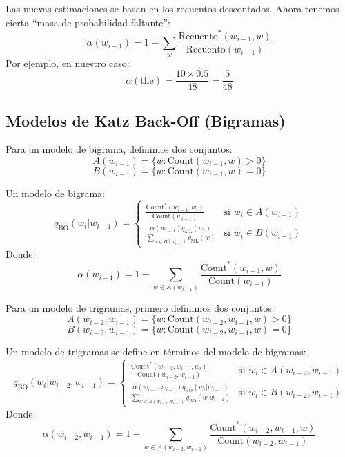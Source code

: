 Las nuevas estimaciones se basan en los recuentos descontados. Ahora tenemos cierta ``masa de probabilidad faltante'':
    \[
    \alpha(w_{i-1}) = 1 - \sum_{w} \frac{{\text{{Recuento}}^*(w_{i-1}, w)}}{{\text{{Recuento}}(w_{i-1})}}
    \]
    Por ejemplo, en nuestro caso:
    \[
    \alpha(\text{{the}}) = \frac{{10 \times 0.5}}{{48}} = \frac{{5}}{{48}}
    \]



\subsection{Modelos de Katz Back-Off (Bigramas)}

Para un modelo de bigrama, definimos dos conjuntos:
    \[
    A(w_{i-1}) = \{w : \text{Count}(w_{i-1}, w) > 0\}
    \]
    \[
    B(w_{i-1}) = \{w : \text{Count}(w_{i-1}, w) = 0\}
    \]

Un modelo de bigrama:
    \[
    q_{\text{BO}}(w_i | w_{i-1}) =
    \begin{cases}
        \frac{\text{Count}^*(w_{i-1}, w_i)}{\text{Count}(w_{i-1})} & \text{si } w_i \in A(w_{i-1}) \\
        \frac{\alpha(w_{i-1}) q_{\text{ML}}(w_i)}{\sum_{w \in B(w_{i-1})} q_{\text{ML}}(w)} & \text{si } w_i \in B(w_{i-1})
    \end{cases}
    \]
Donde:
    \[
    \alpha(w_{i-1}) = 1 - \sum_{w \in A(w_{i-1})} \frac{\text{Count}^*(w_{i-1}, w)}{\text{Count}(w_{i-1})}
    \]

Para un modelo de trigramas, primero definimos dos conjuntos:
    \[
    A(w_{i-2}, w_{i-1}) = \{w : \text{Count}(w_{i-2}, w_{i-1}, w) > 0\}
    \]
    \[
    B(w_{i-2}, w_{i-1}) = \{w : \text{Count}(w_{i-2}, w_{i-1}, w) = 0\}
    \]

Un modelo de trigramas se define en términos del modelo de bigramas:
    \[
    q_{\text{BO}}(w_i | w_{i-2}, w_{i-1}) =
    \begin{cases}
        \frac{\text{Count}^*(w_{i-2}, w_{i-1}, w_i)}{\text{Count}(w_{i-2}, w_{i-1})} & \text{si } w_i \in A(w_{i-2}, w_{i-1}) \\
        \frac{\alpha(w_{i-2}, w_{i-1}) q_{\text{BO}}(w_i|w_{i-1})}{\sum_{w \in B(w_{i-2}, w_{i-1})} q_{\text{BO}}(w|w_{i-1})} & \text{si } w_i \in B(w_{i-2}, w_{i-1})
    \end{cases}
    \]
Donde:
    \[
    \alpha(w_{i-2}, w_{i-1}) = 1 - \sum_{w \in A(w_{i-2}, w_{i-1})} \frac{\text{Count}^*(w_{i-2}, w_{i-1}, w)}{\text{Count}(w_{i-2}, w_{i-1})}
    \]


